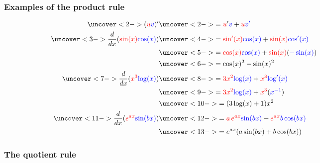 \documentclass[9pt]{beamer}
\begin{document}
\begin{frame}[t]
 \frametitle{Examples of the product rule}
 \begin{align*}
  \uncover<2->{(\RED{u}\BLUE{v})'} & 
  \uncover<2->{=\RED{u}'\BLUE{v}+\RED{u}\BLUE{v'}
   \hphantom{mmmmmmmmmmmmmmmmmmmmmm}} \\
  \uncover<3->{\frac{d}{dx}(\RED{\sin(x)}\BLUE{\cos(x)})} &
  \uncover<4->{=\RED{\sin'(x)}\BLUE{\cos(x)} +
   \RED{\sin(x)}\BLUE{\cos'(x)}}  \\ &
  \uncover<5->{=\RED{\cos(x)}\BLUE{\cos(x)} + 
   \RED{\sin(x)}(\BLUE{-\sin(x)}) } \\ &
  \uncover<6->{=\cos(x)^2 - \sin(x)^2 } \\
  \uncover<7->{\frac{d}{dx}(\RED{x^3}\BLUE{\log(x)})} &
  \uncover<8->{=\RED{3x^2}\BLUE{\log(x)} + 
   \RED{x^3}\BLUE{\log'(x)} } \\ &
  \uncover<9->{=\RED{3x^2}\BLUE{\log(x)} + 
   \RED{x^3}(\BLUE{x^{-1}})} \\ &
  \uncover<10->{=(3\log(x) + 1)x^2 } \\ 
  \uncover<11->{\frac{d}{dx}(\RED{e^{ax}}\BLUE{\sin(bx)})} &
  \uncover<12->{=\RED{a\,e^{ax}}\BLUE{\sin(bx)} +
   \RED{e^{ax}}\BLUE{b\cos(bx)}}  \\ &
  \uncover<13->{=e^{ax}(a\sin(bx)+b\cos(bx))}
 \end{align*}
\end{frame}

\begin{frame}[t]
 \frametitle{The quotient rule}
 \begin{itemize}
 \end{itemize}
\end{frame}
\end{document}

